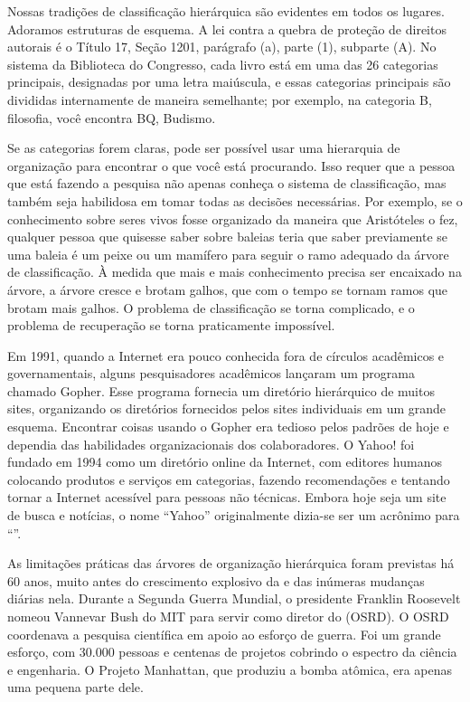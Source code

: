Nossas tradições de classificação hierárquica são evidentes em todos os lugares. Adoramos
estruturas de esquema. A lei contra a quebra de proteção de direitos autorais é o Título 17,
Seção 1201, parágrafo (a), parte (1), subparte (A). No sistema da Biblioteca do Congresso,
cada livro está em uma das 26 categorias principais, designadas por uma letra maiúscula, e
essas categorias principais são divididas internamente de maneira semelhante; por exemplo, na
categoria B, filosofia, você encontra BQ, Budismo.

Se as categorias forem claras, pode ser possível usar uma hierarquia de organização para
encontrar o que você está procurando. Isso requer que a pessoa que está fazendo a pesquisa
não apenas conheça o sistema de classificação, mas também seja habilidosa em tomar todas as
decisões necessárias. Por exemplo, se o conhecimento sobre seres vivos fosse organizado da
maneira que Aristóteles o fez, qualquer pessoa que quisesse saber sobre baleias teria que saber
previamente se uma baleia é um peixe ou um mamífero para seguir o ramo adequado da árvore de
classificação. À medida que mais e mais conhecimento precisa ser encaixado na árvore, a árvore
cresce e brotam galhos, que com o tempo se tornam ramos que brotam mais galhos. O problema de
classificação se torna complicado, e o problema de recuperação se torna praticamente impossível.

Em 1991, quando a Internet era pouco conhecida fora de círculos acadêmicos e governamentais,
alguns pesquisadores acadêmicos lançaram um programa chamado Gopher. Esse programa fornecia
um diretório hierárquico de muitos sites, organizando os diretórios fornecidos pelos sites
individuais em um grande esquema. Encontrar coisas usando o Gopher era tedioso pelos padrões
de hoje e dependia das habilidades organizacionais dos colaboradores. O Yahoo! foi fundado em
1994 como um diretório online da Internet, com editores humanos colocando produtos e serviços
em categorias, fazendo recomendações e tentando tornar a Internet acessível para pessoas não
técnicas. Embora hoje seja um site de busca e notícias, o nome ``Yahoo'' originalmente dizia-se
ser um acrônimo para ``''.

As limitações práticas das árvores de organização hierárquica foram previstas há 60 anos, muito
antes do crescimento explosivo da  e das inúmeras mudanças diárias nela.
Durante a Segunda Guerra Mundial, o presidente Franklin Roosevelt nomeou Vannevar Bush do MIT
para servir como diretor do  (OSRD). O
OSRD coordenava a pesquisa científica em apoio ao esforço de guerra. Foi um grande esforço, com
30.000 pessoas e centenas de projetos cobrindo o espectro da ciência e engenharia. O Projeto
Manhattan, que produziu a bomba atômica, era apenas uma pequena parte dele.

